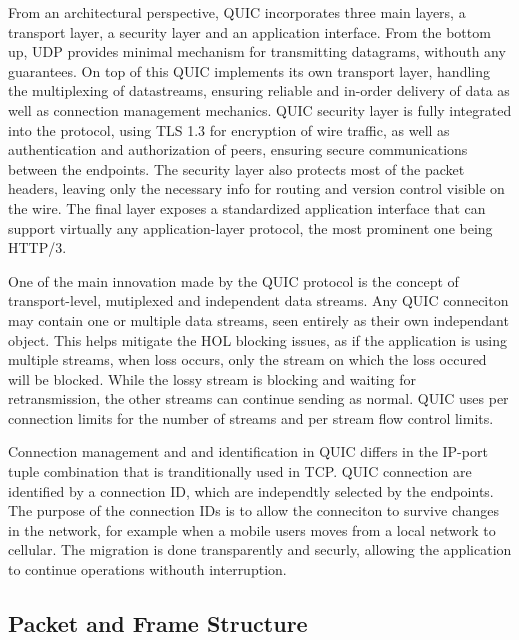 \documentclass[english, 12pt, a4paper, elec, utf8, a-2b, online]{aaltothesis}
\begin{document}
From an architectural perspective, QUIC incorporates three main layers, a transport
layer, a security layer and an application interface. From the bottom up, UDP provides
minimal mechanism for transmitting datagrams, withouth any guarantees. On top of this
QUIC implements its own transport layer, handling the multiplexing of datastreams,
ensuring reliable and in-order delivery of data as well as connection management
mechanics\cite{rfc9000}. QUIC security layer is fully integrated into the protocol, using TLS 1.3
for encryption of wire traffic, as well as authentication and authorization of peers, ensuring
secure communications between the endpoints. The security layer also protects most of
the packet headers, leaving only the necessary info for routing and version control
visible on the wire\cite{rfc9001}. The final layer exposes a standardized application
interface that can support virtually any application-layer protocol, the most prominent
one being HTTP/3\cite{rfc9113}.

One of the main innovation made by the QUIC protocol is the concept of transport-level,
mutiplexed and independent data streams. Any QUIC conneciton may contain one or multiple
data streams, seen entirely as their own independant object. This helps mitigate the
HOL blocking issues, as if the application is using multiple streams, when loss occurs,
only the stream on which the loss occured will be blocked. While the lossy stream is
blocking and waiting for retransmission, the other streams can continue sending as 
normal. QUIC uses per connection limits for the number of streams and per stream
flow control limits\cite{rfc9000}.

Connection management and and identification in QUIC differs in the IP-port tuple
combination that is tranditionally used in TCP. QUIC connection are identified by a
connection ID, which are independtly selected by the endpoints. The purpose of the
connection IDs is to allow the conneciton to survive changes in the network, for example
when a mobile users moves from a local network to cellular. The migration is done transparently
and securly, allowing the application to continue operations withouth interruption\cite{rfc9000}.

\subsection{Packet and Frame Structure}
\end{document}
